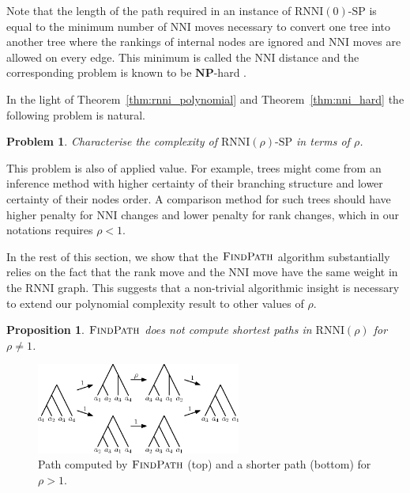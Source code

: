 \documentclass[11pt]{amsart}
\newtheorem{proposition}{Proposition}
\newtheorem{problem}{Problem}
\newcommand{\rnni}{\mathrm{RNNI}}
\newcommand{\findpath}{\textsc{FindPath}}
\newcommand{\nni}{\mathrm{NNI}}
\newcommand{\np}{\mathbf{NP}}
\newcommand{\decprob}[1]{\rnni(#1)\text{-}\mathrm{SP}}
\begin{document}
\proof
Note that the length of the path required in an instance of $\decprob{0}$ is equal to the minimum number of $\nni$ moves necessary to convert one tree into another tree where the rankings of internal nodes are ignored and $\nni$ moves are allowed on every edge.
This minimum is called the $\nni$ distance and the corresponding problem is known to be $\np$-hard \autocite{Dasgupta2000-xa}.
\endproof

In the light of Theorem~\ref{thm:rnni_polynomial} and Theorem~\ref{thm:nni_hard} the following problem is natural.

\begin{problem}
Characterise the complexity of $\decprob{\rho}$ in terms of $\rho$.
\label{prblm:rho_range}
\end{problem}

This problem is also of applied value.
For example, trees might come from an inference method with higher certainty of their branching structure and lower certainty of their nodes order.
A comparison method for such trees should have higher penalty for $\nni$ changes and lower penalty for rank changes, which in our notations requires $\rho < 1$.

In the rest of this section, we show that the $\findpath$ algorithm substantially relies on the fact that the rank move and the $\nni$ move have the same weight in the $\rnni$ graph.
This suggests that a non-trivial algorithmic insight is necessary to extend our polynomial complexity result to other values of $\rho$.

\begin{proposition}
$\findpath$ does not compute shortest paths in $\rnni(\rho)$ for $\rho \neq 1$.
\label{prop:fp_only_rnni}
\end{proposition}

\proof

\begin{figure}[ht]
\centering
\includegraphics[width=0.6\textwidth]{fp_rho_greater_1_counterexample}
\caption{Path computed by $\findpath$ (top) and a shorter path (bottom) for $\rho > 1$.}
\label{fig:fp_rho_greater_1_counterexample}
\end{figure}
\end{document}
